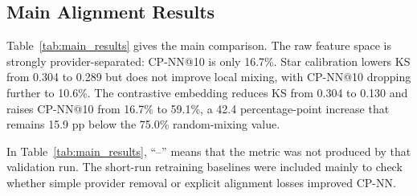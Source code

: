 \documentclass[conference,a4paper]{IEEEtran}
\begin{document}
\subsection{Main Alignment Results}

Table~\ref{tab:main_results} gives the main comparison. The raw feature space is strongly provider-separated: CP-NN@10 is only 16.7\%. Star calibration lowers KS from 0.304 to 0.289 but does not improve local mixing, with CP-NN@10 dropping further to 10.6\%. The contrastive embedding reduces KS from 0.304 to 0.130 and raises CP-NN@10 from 16.7\% to 59.1\%, a 42.4 percentage-point increase that remains 15.9 pp below the 75.0\% random-mixing value.

\begin{table}[t]
\caption{Main Alignment and Baseline Results}
\label{tab:main_results}
\end{table}

In Table~\ref{tab:main_results}, ``--'' means that the metric was not produced by that validation run. The short-run retraining baselines were included mainly to check whether simple provider removal or explicit alignment losses improved CP-NN.
\end{document}

